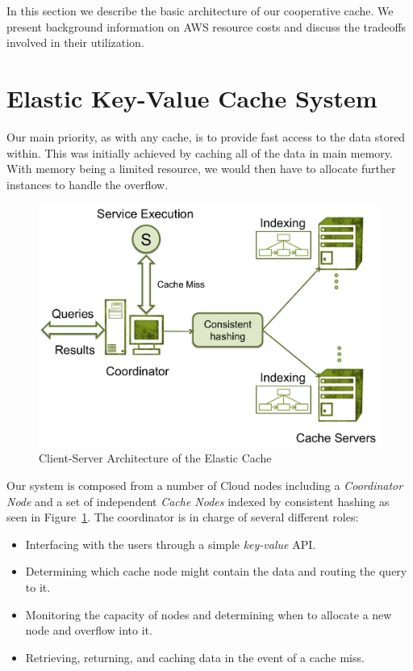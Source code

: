 In this section we describe the basic architecture of our cooperative cache. We
present background information on AWS resource costs and discuss the tradeoffs
involved in their utilization.

\section{Elastic Key-Value Cache System} %
\label{sec:Elastic_Key-Value_Cache_System}
Our main priority, as with any cache, is to provide fast access to the data
stored within. This was initially achieved by caching all of the data in main
memory. With memory being a limited resource, we would then have to allocate
further instances to handle the overflow.

\begin{figure}
\begin{center}
\includegraphics[scale=0.5]{figures/arch.pdf}
\end{center}
\caption{Client-Server Architecture of the Elastic Cache}
\label{fig:architecture}
\end{figure}

Our system is composed from a number of Cloud nodes including a
\emph{Coordinator Node} and a set of independent \emph{Cache Nodes} indexed by
consistent hashing as seen in Figure~\ref{fig:architecture}. The coordinator is
in charge of several different roles:
\begin{itemize}
  \item Interfacing with the users through a simple \emph{key-value} API.
	\item Determining which cache node might contain the data and routing the
		query to it.
	\item Monitoring the capacity of nodes and determining when to allocate a new
		node and overflow into it.
	\item Retrieving, returning, and caching data in the event of a cache miss.
\end{itemize}

